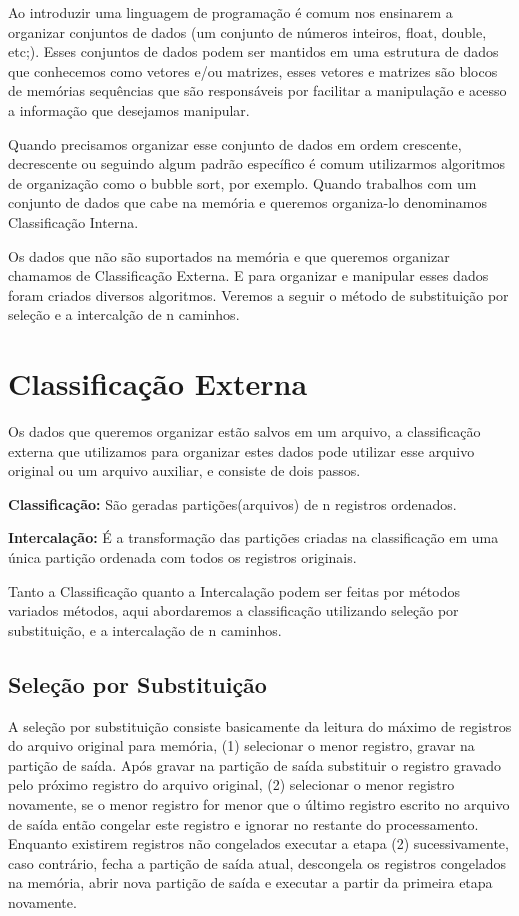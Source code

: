\setcounter{chapter}{+1}

Ao introduzir uma linguagem de programação é comum nos ensinarem a organizar conjuntos de dados (um conjunto de números inteiros, float, double, etc;). Esses conjuntos de dados podem ser mantidos em uma estrutura de dados que conhecemos como vetores e/ou matrizes, esses vetores e matrizes são blocos de memórias sequências que são responsáveis por facilitar a manipulação e acesso a informação que desejamos manipular.\par
Quando precisamos organizar esse conjunto de dados em ordem crescente, decrescente ou seguindo algum padrão específico é comum utilizarmos algoritmos de organização como o bubble sort, por exemplo. Quando trabalhos com um conjunto de dados que cabe na memória e queremos organiza-lo denominamos Classificação Interna.\par
Os dados que não são suportados na memória e que queremos organizar chamamos de Classificação Externa. E para organizar e manipular esses dados foram criados diversos algoritmos. Veremos a seguir o método de substituição por seleção e a intercalção de n caminhos.

\section{Classificação Externa}

Os dados que queremos organizar estão salvos em um arquivo, a classificação externa que utilizamos para organizar estes dados pode utilizar esse arquivo original ou um arquivo auxiliar, e consiste de dois passos.\par
\textbf{Classificação:} São geradas partições(arquivos) de n registros ordenados. \par
\textbf{Intercalação:} É a transformação das partições criadas na classificação em uma única partição ordenada com todos os registros originais.\par
Tanto a Classificação quanto a Intercalação podem ser feitas por métodos variados métodos, aqui abordaremos a classificação utilizando seleção por substituição, e a intercalação de n caminhos.
\newpage
\subsection{Seleção por Substituição}

A seleção por substituição consiste basicamente da leitura do máximo de registros do arquivo original para memória, (1) selecionar o menor registro, gravar na partição de saída. Após gravar na partição de saída substituir o registro gravado pelo próximo registro do arquivo original, (2) selecionar o menor registro novamente, se o menor registro for menor que o último registro escrito no arquivo de saída então congelar este registro e ignorar no restante do processamento. Enquanto existirem registros não congelados executar a etapa (2) sucessivamente, caso contrário, fecha a partição de saída atual, descongela os registros congelados na memória, abrir nova partição de saída e executar a partir da primeira etapa novamente. 



